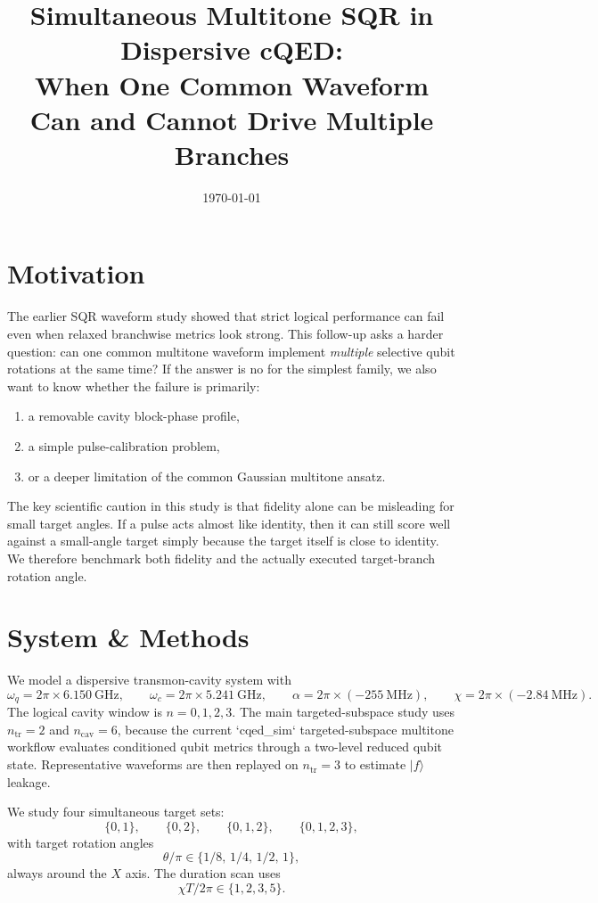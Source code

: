 \documentclass[11pt]{article}
\title{Simultaneous Multitone SQR in Dispersive cQED:\\
When One Common Waveform Can and Cannot Drive Multiple Branches}
\author{}
\date{\today}
\begin{document}
\maketitle

\section{Motivation}

The earlier SQR waveform study showed that strict logical performance can fail
even when relaxed branchwise metrics look strong. This follow-up asks a harder
question: can one common multitone waveform implement \emph{multiple} selective
qubit rotations at the same time? If the answer is no for the simplest family,
we also want to know whether the failure is primarily:
\begin{enumerate}
    \item a removable cavity block-phase profile,
    \item a simple pulse-calibration problem,
    \item or a deeper limitation of the common Gaussian multitone ansatz.
\end{enumerate}

The key scientific caution in this study is that fidelity alone can be
misleading for small target angles. If a pulse acts almost like identity, then
it can still score well against a small-angle target simply because the target
itself is close to identity. We therefore benchmark both fidelity and the
actually executed target-branch rotation angle.

\section{System \& Methods}

We model a dispersive transmon-cavity system with
\[
\omega_q = 2\pi \times 6.150~\mathrm{GHz}, \qquad
\omega_c = 2\pi \times 5.241~\mathrm{GHz}, \qquad
\alpha = 2\pi \times (-255~\mathrm{MHz}), \qquad
\chi = 2\pi \times (-2.84~\mathrm{MHz}).
\]
The logical cavity window is \(n = 0,1,2,3\). The main targeted-subspace study
uses \(n_{\mathrm{tr}}=2\) and \(n_{\mathrm{cav}}=6\), because the current
`cqed\_sim` targeted-subspace multitone workflow evaluates conditioned qubit
metrics through a two-level reduced qubit state. Representative waveforms are
then replayed on \(n_{\mathrm{tr}}=3\) to estimate \(|f\rangle\) leakage.

We study four simultaneous target sets:
\[
\{0,1\}, \qquad \{0,2\}, \qquad \{0,1,2\}, \qquad \{0,1,2,3\},
\]
with target rotation angles
\[
\theta/\pi \in \{1/8,\, 1/4,\, 1/2,\, 1\},
\]
always around the \(X\) axis. The duration scan uses
\[
\chi T / 2\pi \in \{1,2,3,5\}.
\]
\end{document}
